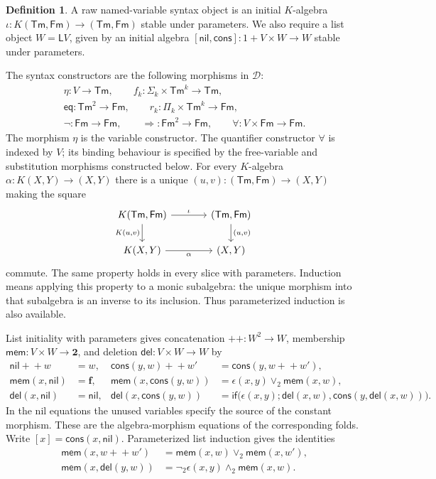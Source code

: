 \documentclass[11pt]{article}
\theoremstyle{definition}\newtheorem{definition}[theorem]{Definition}
\newcommand{\Tm}{\mathsf{Tm}}
\newcommand{\Fm}{\mathsf{Fm}}
\newcommand{\Two}{\mathbf 2}
\newcommand{\List}{\mathsf L}
\newcommand{\nil}{\mathsf{nil}}
\newcommand{\cons}{\mathsf{cons}}
\newcommand{\mem}{\mathsf{mem}}
\newcommand{\del}{\mathsf{del}}
\begin{document}
\begin{definition}\label{def:categorical-syntax}
A raw named-variable syntax object is an initial $K$-algebra
$\iota:K(\Tm,\Fm)\to(\Tm,\Fm)$ stable under parameters.
We also require a list object $W=\List V$, given by an initial
algebra $[\nil,\cons]:1+V\times W\to W$ stable under parameters.
\end{definition}

The syntax constructors are the following morphisms in $\mathcal D$:
\begin{gather*}
 \eta:V\to\Tm,\qquad f_k:\Sigma_k\times\Tm^k\to\Tm,\\
 {\mathsf{eq}}:\Tm^2\to\Fm,\qquad
 r_k:\Pi_k\times\Tm^k\to\Fm,\\
 \neg:\Fm\to\Fm,\qquad
 {\Rightarrow}:\Fm^2\to\Fm,\qquad
 {\forall}:V\times\Fm\to\Fm.
\end{gather*}
The morphism $\eta$ is the variable constructor.
The quantifier constructor $\forall$ is indexed
by $V$; its binding behaviour is specified by the free-variable and
substitution morphisms constructed below.
For every $K$-algebra $\alpha:K(X,Y)\to(X,Y)$ there is a unique
$(u,v):(\Tm,\Fm)\to(X,Y)$ making the square
\[
\begin{tikzcd}[column sep=large]
 K(\Tm,\Fm)\arrow[r,"\iota"]\arrow[d,"{K(u,v)}"'] &
 (\Tm,\Fm)\arrow[d,"{(u,v)}"]\\
 K(X,Y)\arrow[r,"\alpha"'] & (X,Y)
\end{tikzcd}
\]
commute. The same property holds in every slice with parameters.
Induction means applying this property to a monic subalgebra:
the unique morphism into that subalgebra is an inverse to its
inclusion. Thus parameterized induction is also available.

List initiality with parameters gives concatenation
$+\!+:W^2\to W$, membership $\mem:V\times W\to\Two$, and
deletion $\del:V\times W\to W$ by
\begin{align*}
 \nil+\!+w&=w,&
 \cons(y,w)+\!+w'&=\cons(y,w+\!+w'),\\
 \mem(x,\nil)&=\mathbf{f},&
 \mem(x,\cons(y,w))&=\epsilon(x,y)\vee_2\mem(x,w),\\
 \del(x,\nil)&=\nil,&
 \del(x,\cons(y,w))&=
 \mathsf{if}\bigl(\epsilon(x,y);\del(x,w),
                         \cons(y,\del(x,w))\bigr).
\end{align*}
In the nil equations the unused variables specify the source of the
constant morphism. These are the algebra-morphism equations of the
corresponding folds. Write $[x]=\cons(x,\nil)$.
Parameterized list induction gives the identities
\begin{align*}
 \mem(x,w+\!+w')&=\mem(x,w)\vee_2\mem(x,w'),\\
 \mem(x,\del(y,w))&=\neg_2\epsilon(x,y)\wedge_2\mem(x,w).
\end{align*}
\end{document}
